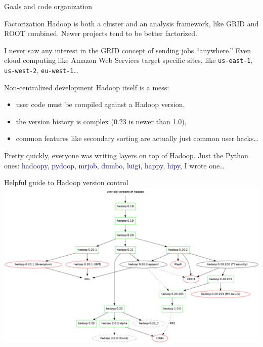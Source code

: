 \documentclass{beamer}
\begin{document}
\begin{frame}{Goals and code organization}

\begin{block}{Factorization}
Hadoop is both a cluster and an analysis framework, like GRID and ROOT combined. Newer projects tend to be better factorized.

\vspace{0.5\baselineskip}
I never saw any interest in the GRID concept of sending jobs ``anywhere.'' Even cloud computing like Amazon Web Services target specific sites, like {\tt us-east-1}, {\tt us-west-2}, {\tt eu-west-1}\ldots
\end{block}

\begin{block}{Non-centralized development}
Hadoop itself is a mess:
\begin{itemize}
\item user code must be compiled against a Hadoop version,
\item the version history is complex (0.23 is newer than 1.0),
\item common features like secondary sorting are actually just common user hacks\ldots
\end{itemize}

\vspace{0.2 cm}
Pretty quickly, everyone was writing layers on top of Hadoop. Just the Python ones: \textcolor{darkblue}{hadoopy}, \textcolor{darkblue}{pydoop}, \textcolor{darkblue}{mrjob}, \textcolor{darkblue}{dumbo}, \textcolor{darkblue}{luigi}, \textcolor{darkblue}{happy}, \textcolor{darkblue}{hipy}, I wrote one\ldots
\end{block}
\end{frame}

\begin{frame}{Helpful guide to Hadoop version control}
\includegraphics[width=\linewidth]{hadoop_versions.png}
\end{frame}
\end{document}

